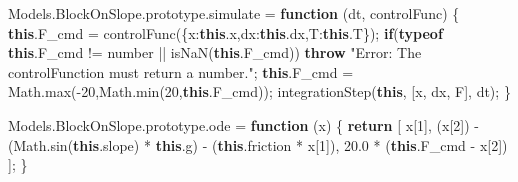 \documentclass[
  a4paper,
  DIV=11,
  numbers=noendperiod]{scrreprt}
\newenvironment{Shaded}{\begin{snugshade}}{\end{snugshade}}
\newcommand{\AttributeTok}[1]{\textcolor[rgb]{0.40,0.45,0.13}{#1}}
\newcommand{\BuiltInTok}[1]{\textcolor[rgb]{0.00,0.23,0.31}{#1}}
\newcommand{\ControlFlowTok}[1]{\textcolor[rgb]{0.00,0.23,0.31}{\textbf{#1}}}
\newcommand{\DataTypeTok}[1]{\textcolor[rgb]{0.68,0.00,0.00}{#1}}
\newcommand{\DecValTok}[1]{\textcolor[rgb]{0.68,0.00,0.00}{#1}}
\newcommand{\FloatTok}[1]{\textcolor[rgb]{0.68,0.00,0.00}{#1}}
\newcommand{\FunctionTok}[1]{\textcolor[rgb]{0.28,0.35,0.67}{#1}}
\newcommand{\KeywordTok}[1]{\textcolor[rgb]{0.00,0.23,0.31}{\textbf{#1}}}
\newcommand{\NormalTok}[1]{\textcolor[rgb]{0.00,0.23,0.31}{#1}}
\newcommand{\OperatorTok}[1]{\textcolor[rgb]{0.37,0.37,0.37}{#1}}
\newcommand{\PreprocessorTok}[1]{\textcolor[rgb]{0.68,0.00,0.00}{#1}}
\newcommand{\StringTok}[1]{\textcolor[rgb]{0.13,0.47,0.30}{#1}}
\newcommand*\circled[1]{\tikz[baseline=(char.base)]{
          \node[shape=circle,draw,inner sep=1pt] (char) {{\scriptsize#1}};}}
\begin{document}
\begin{codelisting}
\begin{Shaded}
\begin{Highlighting}[]
\NormalTok{Models}\OperatorTok{.}\AttributeTok{BlockOnSlope}\OperatorTok{.}\AttributeTok{prototype}\OperatorTok{.}\AttributeTok{simulate} \OperatorTok{=} \KeywordTok{function}\NormalTok{ (dt}\OperatorTok{,}\NormalTok{ controlFunc)}
\NormalTok{\{}
    \KeywordTok{this}\OperatorTok{.}\AttributeTok{F\_cmd} \OperatorTok{=} \FunctionTok{controlFunc}\NormalTok{(\{}\DataTypeTok{x}\OperatorTok{:}\KeywordTok{this}\OperatorTok{.}\AttributeTok{x}\OperatorTok{,}\DataTypeTok{dx}\OperatorTok{:}\KeywordTok{this}\OperatorTok{.}\AttributeTok{dx}\OperatorTok{,}\DataTypeTok{T}\OperatorTok{:}\KeywordTok{this}\OperatorTok{.}\AttributeTok{T}\NormalTok{\})}\OperatorTok{;}
    \ControlFlowTok{if}\NormalTok{(}\KeywordTok{typeof} \KeywordTok{this}\OperatorTok{.}\AttributeTok{F\_cmd} \OperatorTok{!=} \StringTok{\textquotesingle{}number\textquotesingle{}} \OperatorTok{||} \PreprocessorTok{isNaN}\NormalTok{(}\KeywordTok{this}\OperatorTok{.}\AttributeTok{F\_cmd}\NormalTok{)) }\ControlFlowTok{throw} \StringTok{"Error: The controlFunction must return a number."}\OperatorTok{;}
    \KeywordTok{this}\OperatorTok{.}\AttributeTok{F\_cmd} \OperatorTok{=} \BuiltInTok{Math}\OperatorTok{.}\FunctionTok{max}\NormalTok{(}\OperatorTok{{-}}\DecValTok{20}\OperatorTok{,}\BuiltInTok{Math}\OperatorTok{.}\FunctionTok{min}\NormalTok{(}\DecValTok{20}\OperatorTok{,}\KeywordTok{this}\OperatorTok{.}\AttributeTok{F\_cmd}\NormalTok{))}\OperatorTok{;} \hspace*{\fill}\NormalTok{\circled{2}}
    \FunctionTok{integrationStep}\NormalTok{(}\KeywordTok{this}\OperatorTok{,}\NormalTok{ [}\StringTok{\textquotesingle{}x\textquotesingle{}}\OperatorTok{,} \StringTok{\textquotesingle{}dx\textquotesingle{}}\OperatorTok{,} \StringTok{\textquotesingle{}F\textquotesingle{}}\NormalTok{]}\OperatorTok{,}\NormalTok{ dt)}\OperatorTok{;}
\NormalTok{\}}

\NormalTok{Models}\OperatorTok{.}\AttributeTok{BlockOnSlope}\OperatorTok{.}\AttributeTok{prototype}\OperatorTok{.}\AttributeTok{ode} \OperatorTok{=} \KeywordTok{function}\NormalTok{ (x)}
\NormalTok{\{}
    \ControlFlowTok{return}\NormalTok{ [}
\NormalTok{        x[}\DecValTok{1}\NormalTok{]}\OperatorTok{,} \hspace*{\fill}\NormalTok{\circled{3}}
\NormalTok{        (x[}\DecValTok{2}\NormalTok{]) }\OperatorTok{{-}}\NormalTok{ (}\BuiltInTok{Math}\OperatorTok{.}\FunctionTok{sin}\NormalTok{(}\KeywordTok{this}\OperatorTok{.}\AttributeTok{slope}\NormalTok{) }\OperatorTok{*} \KeywordTok{this}\OperatorTok{.}\AttributeTok{g}\NormalTok{) }\OperatorTok{{-}}\NormalTok{ (}\KeywordTok{this}\OperatorTok{.}\AttributeTok{friction} \OperatorTok{*}\NormalTok{ x[}\DecValTok{1}\NormalTok{])}\OperatorTok{,} 
        \FloatTok{20.0} \OperatorTok{*}\NormalTok{ (}\KeywordTok{this}\OperatorTok{.}\AttributeTok{F\_cmd} \OperatorTok{{-}}\NormalTok{ x[}\DecValTok{2}\NormalTok{]) }
\NormalTok{    ]}\OperatorTok{;}
\NormalTok{\}}
\end{Highlighting}
\end{Shaded}

\end{codelisting}
\end{document}

